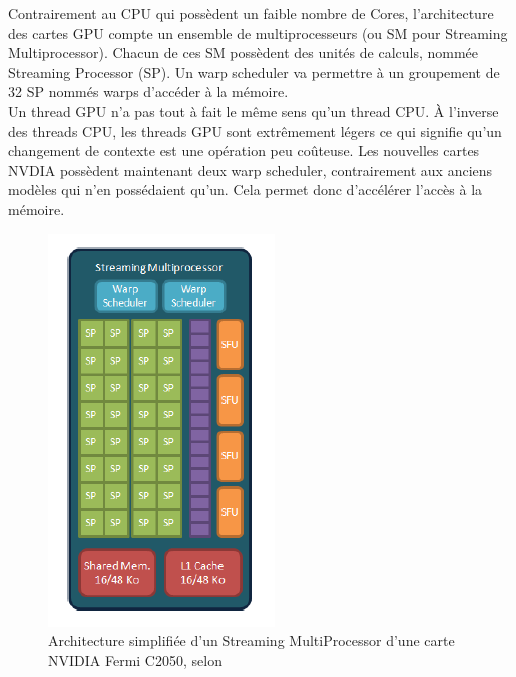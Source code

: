 \documentclass[a4paper,11pt]{report}
\begin{document}
\normalsize{

Contrairement au CPU qui possèdent un faible nombre de Cores, l’architecture des cartes GPU compte un ensemble de multiprocesseurs (ou SM pour Streaming Multiprocessor). Chacun de ces SM possèdent des unités de calculs, nommée Streaming Processor (SP). Un warp scheduler va permettre à un groupement de 32 SP nommés warps d'accéder à la mémoire.\\

Un thread GPU n’a pas tout à fait le même sens qu’un thread CPU. À l’inverse des threads CPU, les threads GPU sont extrêmement légers ce qui signifie qu’un changement de contexte est une opération peu coûteuse. Les nouvelles cartes NVDIA possèdent maintenant deux warp scheduler, contrairement aux anciens modèles qui n'en possédaient qu'un. Cela permet donc d'accélérer l'accès à la mémoire. \\
}

\begin{figure}[h]
   \begin{center}
   \includegraphics[scale = 0.8]{SM.png}
   \end{center}
  \caption{Architecture simplifiée d'un Streaming MultiProcessor d'une carte NVIDIA Fermi C2050, selon \cite{Passerat-Palmbach.etal.2011}}
\end{figure}
\end{document}
